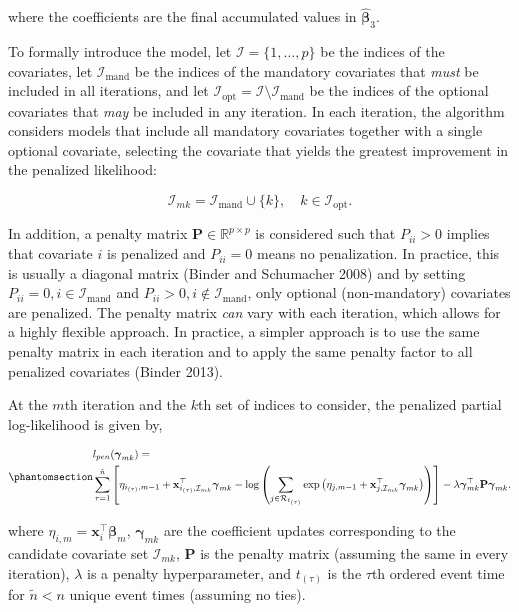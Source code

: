 \documentclass[
  letterpaper,
  krantz2]{style/krantz}
\begin{document}
where the coefficients are the final accumulated values in
\(\hat{\boldsymbol{\beta}}_3\).

To formally introduce the model, let \(\mathcal{I}= \{1,\ldots,p\}\) be
the indices of the covariates, let \(\mathcal{I}_{\text{mand}}\) be the
indices of the mandatory covariates that \emph{must} be included in all
iterations, and let
\(\mathcal{I}_{\text{opt}} = \mathcal{I}\setminus \mathcal{I}_{\text{mand}}\)
be the indices of the optional covariates that \emph{may} be included in
any iteration. In each iteration, the algorithm considers models that
include all mandatory covariates together with a single optional
covariate, selecting the covariate that yields the greatest improvement
in the penalized likelihood:

\[
\mathcal{I}_{mk} = \mathcal{I}_{\text{mand}} \cup \{k\}, \quad k \in \mathcal{I}_{\text{opt}}.
\]

In addition, a penalty matrix \(\mathbf{P} \in \mathbb{R}^{p \times p}\)
is considered such that \(P_{ii} > 0\) implies that covariate \(i\) is
penalized and \(P_{ii} = 0\) means no penalization. In practice, this is
usually a diagonal matrix (Binder and Schumacher 2008) and by setting
\(P_{ii} = 0, i \in \mathcal{I}_{\text{mand}}\) and
\(P_{ii} > 0, i \not\in \mathcal{I}_{\text{mand}}\), only optional
(non-mandatory) covariates are penalized. The penalty matrix \emph{can}
vary with each iteration, which allows for a highly flexible approach.
In practice, a simpler approach is to use the same penalty matrix in
each iteration and to apply the same penalty factor to all penalized
covariates (Binder 2013).

At the \(m\)th iteration and the \(k\)th set of indices to consider, the
penalized partial log-likelihood is given by,

\begin{equation}\phantomsection\label{eq-coxboost}{
\begin{aligned}
&l_{pen}(\boldsymbol{\gamma}_{mk}) = \\
&\sum_{\tau=1}^{\tilde{n}} \left[\eta_{i_{(\tau)},m-1} + \mathbf{x}_{i_{(\tau)},\mathcal{I}_{mk}}^\top\boldsymbol{\gamma}_{mk} - \log\left(\sum_{j \in \mathcal{R}_{t_{(\tau)}}} \exp\left(\eta_{j,m-1} + \mathbf{x}_{j,\mathcal{I}_{mk}}^\top\boldsymbol{\gamma}_{mk}\right)\right)\right] - \lambda\boldsymbol{\gamma}^\top_{mk}\mathbf{P}\boldsymbol{\gamma}_{mk}.
\end{aligned}
}\end{equation}

where \(\eta_{i,m} = \mathbf{x}_i^\top\boldsymbol{\beta}_m\),
\(\boldsymbol{\gamma}_{mk}\) are the coefficient updates corresponding
to the candidate covariate set \(\mathcal{I}_{mk}\), \(\mathbf{P}\) is
the penalty matrix (assuming the same in every iteration), \(\lambda\)
is a penalty hyperparameter, and \(t_{(\tau)}\) is the \(\tau\)th
ordered event time for \(\tilde{n} < n\) unique event times (assuming no
ties).
\end{document}
